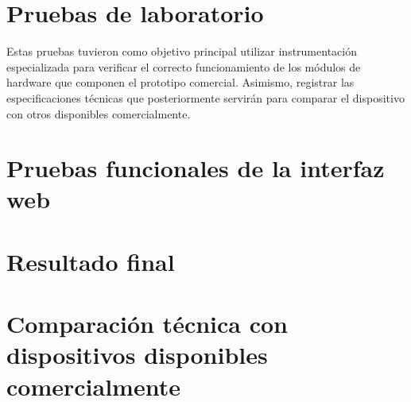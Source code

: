 \section{Pruebas de laboratorio}

Estas pruebas tuvieron como objetivo principal utilizar instrumentación especializada para verificar el correcto funcionamiento de los módulos de hardware que componen el prototipo comercial. Asimismo, registrar las especificaciones técnicas que posteriormente servirán para comparar el dispositivo con otros disponibles comercialmente.



\section{Pruebas funcionales de la interfaz web}
\label{sec:pruebasWI}


\section{Resultado final}
\label{sec:resultadoF}


\section{Comparación técnica con dispositivos disponibles comercialmente}
\label{sec:comparacionDDC}


